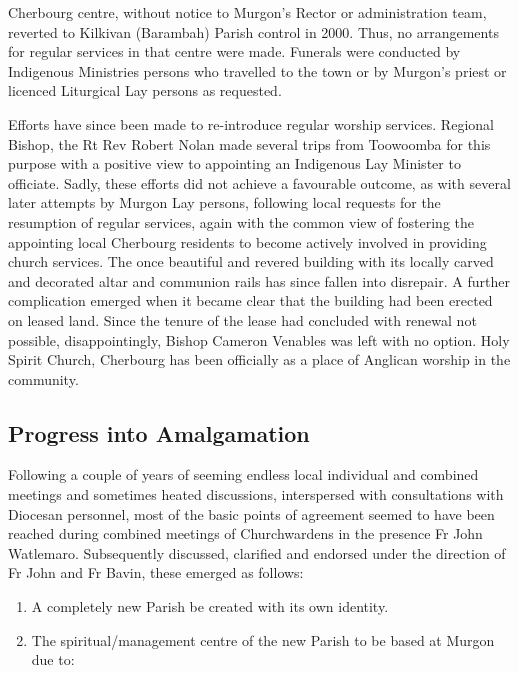 Cherbourg centre, without notice to Murgon's Rector or administration team, reverted to Kilkivan (Barambah) Parish control in 2000. Thus, no arrangements for regular services in that centre were made. Funerals were conducted by Indigenous Ministries persons who travelled to the town or by Murgon's priest or licenced Liturgical Lay persons as requested.

Efforts have since been made to re-introduce regular worship services. Regional Bishop, the Rt Rev Robert Nolan made several trips from Toowoomba for this purpose with a positive view to appointing an Indigenous Lay Minister to officiate. Sadly, these efforts did not achieve a favourable outcome, as with several later attempts by Murgon Lay persons, following local requests for the resumption of regular services, again with the common view of fostering the appointing local Cherbourg residents to become actively involved in providing church services. The once beautiful and revered building with its locally carved and decorated altar and communion rails has since fallen into disrepair. A further complication emerged when it became clear that the building had been erected on leased land. Since the tenure of the lease had concluded with renewal not possible, disappointingly, Bishop Cameron Venables was left with no option. Holy Spirit Church, Cherbourg has been officially as a place of Anglican worship in the community.

\hypertarget{progress-into-amalgamation}{%
\subsection{Progress into Amalgamation}\label{progress-into-amalgamation}}

Following a couple of years of seeming endless local individual and combined meetings and sometimes heated discussions, interspersed with consultations with Diocesan personnel, most of the basic points of agreement seemed to have been reached during combined meetings of Churchwardens in the presence Fr John Watlemaro. Subsequently discussed, clarified and endorsed under the direction of Fr John and Fr Bavin, these emerged as follows:

\begin{enumerate}
\def\labelenumi{\arabic{enumi}.}
\item
  A completely new Parish be created with its own identity.
\item
  The spiritual/management centre of the new Parish to be based at Murgon due to:
\end{enumerate}

